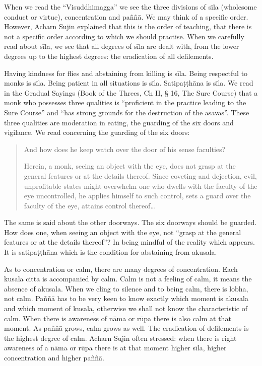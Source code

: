 When we read the ``Visuddhimagga'' we see the three divisions of sīla (wholesome conduct or virtue), concentration and paññā. We may think of a specific order. However, Acharn Sujin explained that this is the order of teaching, that there is not a specific order according to which we should practise. When we carefully read about sīla, we see that all degrees of sīla are dealt with, from the lower degrees up to the highest degrees: the eradication of all defilements.

Having kindness for flies and abstaining from killing is sīla. Being respectful to monks is sīla. Being patient in all situations is sīla. Satipaṭṭhāna is sīla. We read in the Gradual Sayings (Book of the Threes, Ch II, § 16, The Sure Course) that a monk who possesses three qualities is ``proficient in the practice leading to the Sure Course'' and ``has strong grounds for the destruction of the āsavas''. These three qualities are moderation in eating, the guarding of the six doors and vigilance. We read concerning the guarding of the six doors:

\begin{quote}
And how does he keep watch over the door of his sense faculties?

Herein, a monk, seeing an object with the eye, does not grasp at the general features or at the details thereof. Since coveting and dejection, evil, unprofitable states might overwhelm one who dwells with the faculty of the eye uncontrolled, he applies himself to such control, sets a guard over the faculty of the eye, attains control thereof\ldots
\end{quote}

The same is said about the other doorways. The six doorways should be guarded. How does one, when seeing an object with the eye, not ``grasp at the general features or at the details thereof''? In being mindful of the reality which appears. It is satipaṭṭhāna which is the condition for abstaining from akusala.

As to concentration or calm, there are many degrees of concentration. Each kusala citta is accompanied by calm. Calm is not a feeling of calm, it means the absence of akusala. When we cling to silence and to being calm, there is lobha, not calm. Paññā has to be very keen to know exactly which moment is akusala and which moment of kusala, otherwise we shall not know the characteristic of calm. When there is awareness of nāma or rūpa there is also calm at that moment. As paññā grows, calm grows as well. The eradication of defilements is the highest degree of calm. Acharn Sujin often stressed: when there is right awareness of a nāma or rūpa there is at that moment higher sīla, higher concentration and higher paññā.



